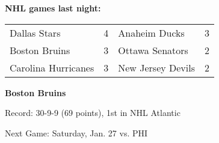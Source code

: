 \textbf{NHL games last night:
}\begin{tabular}{llll}
\toprule
       Dallas Stars & 4 &     Anaheim Ducks & 3 \\
      Boston Bruins & 3 &   Ottawa Senators & 2 \\
Carolina Hurricanes & 3 & New Jersey Devils & 2 \\
\bottomrule
\end{tabular}

\textbf{Boston Bruins}

Record: 30-9-9 (69 points), 1st in NHL Atlantic 

Next Game: Saturday, Jan. 27 vs. PHI